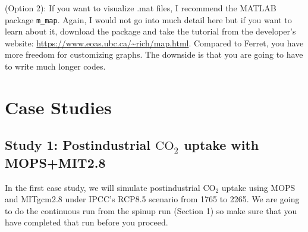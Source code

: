 \documentclass[a4paper]{article}
\def\noin{\noindent }
\begin{document}
\vspace{5mm}
\noin (Option 2): If you want to visualize .mat files, I recommend the MATLAB package \verb|m_map|. Again, I would not go into much detail here but if you want to learn about it, download the package and take the tutorial from the developer's website: \url{https://www.eoas.ubc.ca/~rich/map.html}. Compared to Ferret, you have more freedom for customizing graphs. The downside is that you are going to have to write much longer codes.

\section{Case Studies}
\subsection{Study 1: Postindustrial $\mathrm{CO_{2}}$ uptake with MOPS+MIT2.8}
\noin In the first case study, we will simulate postindustrial $\mathrm{CO_{2}}$ uptake using MOPS and MITgcm2.8 under IPCC's RCP8.5 scenario from 1765 to 2265. We are going to do the continuous run from the spinup run (Section 1) so make sure that you have completed that run before you proceed.
\end{document}

